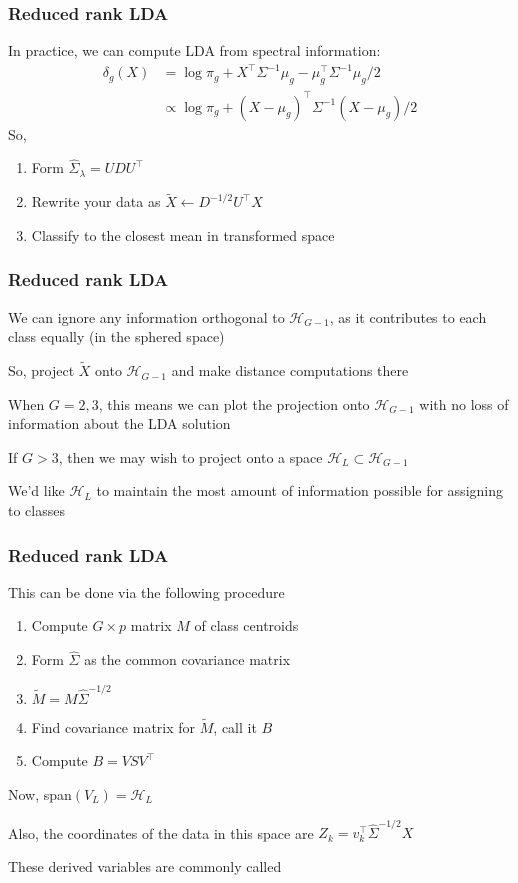 \documentclass[12pt]{beamer}
\begin{document}
\begin{frame}
\frametitle{Reduced rank LDA}
In practice, we can compute LDA from spectral information:
\begin{align*}
\delta_g(X) 
& = 
\log \pi_g + X^{\top} \Sigma^{-1}\mu_g  - \mu_{g}^{\top} \Sigma^{-1} \mu_g /2 \\
&\propto
\log \pi_g + (X - \mu_g)^{\top} \Sigma^{-1}(X - \mu_g)/2 
\end{align*}
So,
\begin{enumerate}
\item {} Form $\hat{\Sigma}_{\lambda} = U D U^{\top}$
\item {} Rewrite your data as $\tilde{X} \leftarrow D^{-1/2} U^{\top} X$
\item {}  Classify to the closest mean in transformed space

\end{enumerate}
\end{frame}

\begin{frame}
\frametitle{Reduced rank LDA}
We can ignore any information orthogonal to $\mathcal{H}_{G-1}$, as it contributes to each
class equally (in the sphered space)

\vsp
So, project $\tilde{X}$ onto $\mathcal{H}_{G-1}$ and make distance computations there

\vsp
When $G = 2,3$, this means we can plot the projection onto $\mathcal{H}_{G-1}$ with
no loss of information about the LDA solution

\vsp
If $G > 3$, then we may wish to project onto a  space $\mathcal{H}_{L} \subset \mathcal{H}_{G-1}$

\vsp
We'd like $\mathcal{H}_L$ to maintain the most amount of information possible for assigning to classes
\end{frame}


\begin{frame}
\frametitle{Reduced rank LDA}
This can be done via the following procedure
\begin{enumerate}
\item {} Compute $G \times p$ matrix $M$ of class centroids
\item {} Form $\hat\Sigma$ as the common covariance matrix
\item {} $\tilde{M} = M \hat\Sigma^{-1/2}$
\item {} Find covariance matrix for $\tilde{M}$, call it $B$
\item {} Compute $B = V S V^{\top}$
\end{enumerate}
\vsp

Now, span$(V_L) = \mathcal{H}_L$

\vsp
Also, the coordinates of the data in this space are $Z_k = v_k^{\top} \hat\Sigma^{-1/2}X$

\vsp
These derived variables are commonly called 
\end{frame}
\end{document}
